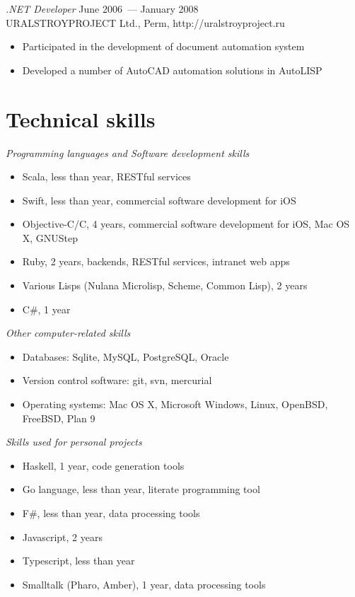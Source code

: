 \documentclass[12pt]{res}
\begin{document}
\begin{resume}
{\sl .NET Developer} \hfill June 2006~--- January 2008 \\
URALSTROYPROJECT Ltd., Perm, http://uralstroyproject.ru
\begin{itemize}
\item Participated in the development of document automation system
\item Developed a number of AutoCAD automation solutions in AutoLISP
\end{itemize}

\section{Technical skills} 

{\sl Programming languages and Software development skills} 
\begin{itemize}
\item Scala, less than year, RESTful services
\item Swift, less than year, commercial software development for iOS
\item Objective-C/C, 4 years, commercial software development for iOS, Mac OS X, GNUStep
\item Ruby, 2 years, backends, RESTful services, intranet web apps
\item Various Lisps (Nulana Microlisp, Scheme, Common Lisp), 2 years
\item C\#, 1 year
\end{itemize}

{\sl Other computer-related skills}
\begin{itemize}
\item Databases: Sqlite, MySQL, PostgreSQL, Oracle
\item Version control software: git, svn, mercurial
\item Operating systems: Mac OS X, Microsoft Windows, Linux, OpenBSD, FreeBSD, Plan 9
\end{itemize} 

{\sl Skills used for personal projects}
\begin{itemize}
\item Haskell, 1 year, code generation tools
\item Go language, less than year, literate programming tool
\item F\#, less than year, data processing tools
\item Javascript, 2 years
\item Typescript, less than year
\item Smalltalk (Pharo, Amber), 1 year, data processing tools
\end{itemize}


\end{resume}
\end{document}
